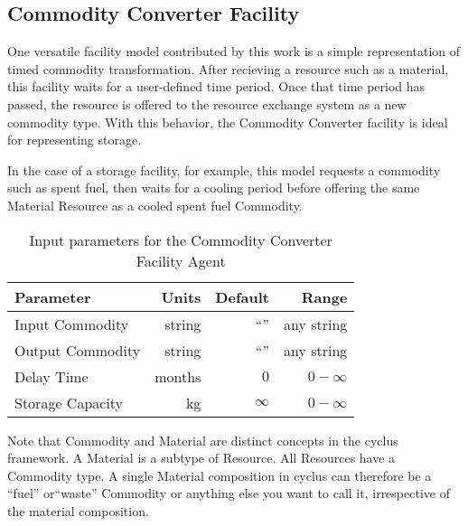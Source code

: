 \subsection{Commodity Converter Facility}

One versatile facility model contributed by this work is a simple
representation of timed commodity transformation. After recieving a resource
such as a material, this facility waits for a user-defined time period. Once
that time period has passed, the resource is offered to the resource exchange
system as a new commodity type. With this behavior, the Commodity Converter
facility is ideal for representing storage.  

In the case of a storage facility, for example, this model requests a commodity 
such as spent fuel, then waits for a cooling period before offering the same 
Material Resource as a cooled spent fuel Commodity.

\begin{table}[h!]
\centering
\begin{tabular}{|l|r|r|r|}
\hline
\textbf{Parameter} & \textbf{Units} & \textbf{Default} & \textbf{Range}\\
\hline
Input Commodity& string & ``'' & any string\\
Output Commodity& string & ``'' & any string\\
Delay Time & months & $0$ & $0-\infty$\\
Storage Capacity & kg & $\infty$ &$0-\infty$ \\
\hline
\end{tabular}
\caption{Input parameters for the Commodity Converter Facility Agent}
\label{tab:commodconverter}
\end{table}


Note that Commodity and Material are distinct concepts in the cyclus framework.
A Material is a subtype of Resource. All Resources have a Commodity type. A
single Material composition in cyclus can therefore be a ``fuel'' or``waste''
Commodity or anything else you want to call it, irrespective of the material
composition. 

